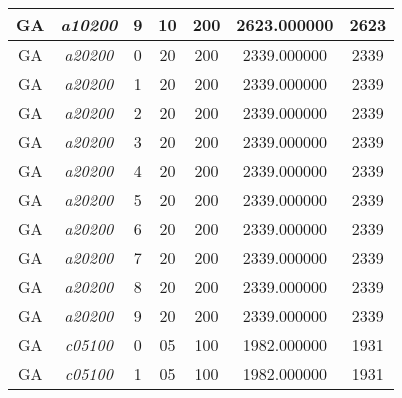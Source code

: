{\begin{longtable}{cc|c|cc|cc}
			GA                 & \textit{a10200}    & 9                               & 10               & 200              & 2623.000000                          & 2623 \\  \hline
			GA                 & \textit{a20200}    & 0                               & 20               & 200              & 2339.000000                          & 2339 \\  
			GA                 & \textit{a20200}    & 1                               & 20               & 200              & 2339.000000                          & 2339 \\  
			GA                 & \textit{a20200}    & 2                               & 20               & 200              & 2339.000000                          & 2339 \\  
			GA                 & \textit{a20200}    & 3                               & 20               & 200              & 2339.000000                          & 2339 \\  
			GA                 & \textit{a20200}    & 4                               & 20               & 200              & 2339.000000                          & 2339 \\  
			GA                 & \textit{a20200}    & 5                               & 20               & 200              & 2339.000000                          & 2339 \\  
			GA                 & \textit{a20200}    & 6                               & 20               & 200              & 2339.000000                          & 2339 \\  
			GA                 & \textit{a20200}    & 7                               & 20               & 200              & 2339.000000                          & 2339 \\  
			GA                 & \textit{a20200}    & 8                               & 20               & 200              & 2339.000000                          & 2339 \\  
			GA                 & \textit{a20200}    & 9                               & 20               & 200              & 2339.000000                          & 2339 \\  \hline
			GA                 & \textit{c05100}    & 0                               & 05               & 100              & 1982.000000                          & 1931 \\  
			GA                 & \textit{c05100}    & 1                               & 05               & 100              & 1982.000000                          & 1931 \\  

\end{longtable}}
